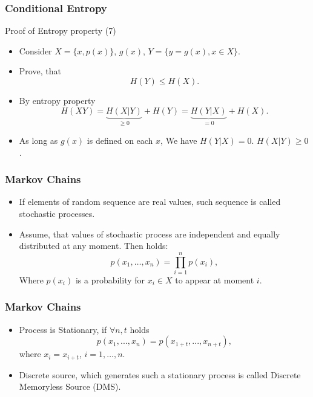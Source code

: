 \documentclass[14pt]{beamer}
\begin{document}
\begin{frame}
\frametitle{Conditional Entropy}
Proof of Entropy property (7)
\begin{itemize}
    
    \item Consider $X = \{x,p(x)\}$, $g(x)$, $Y =\{y = g(x),x\in X\}.$ 
    
    \item Prove, that
    \begin{equation}
    \label{p1eq11} H(Y) \le H(X).
    \end{equation}
    
    \item By entropy property
    \begin{equation}
    \label{p1eq12}
     H(XY) = \underbrace{H(X\vert Y)}_{\ge 0} + H(Y) = \underbrace{H(Y\vert X)}_{=0} + H(X).
    \end{equation}
    
    \item As long as $g(x)$ is defined on each $x$,
    We have $H(Y\vert X) = 0$. $H(X\vert Y) \ge 0$.
    
\end{itemize}
\end{frame}



\begin{frame}
\frametitle{Markov Chains}
\begin{itemize}

    \item If elements of random sequence are real values, such sequence is called stochastic processes.
    
    \item Assume, that values of stochastic process are independent and equally distributed at any moment. Then holds:
    \[
    p(x_1,\dots,x_n ) = \prod\limits_{i = 1}^n {p(x_i )} ,
    \]
    Where $p(x_i )$ is a probability for $x_i \in X$ to appear at moment $i$.
    
\end{itemize}
\end{frame}


\begin{frame}
\frametitle{Markov Chains}
\begin{itemize}
    
    \item Process is Stationary, if $\forall n, t$ holds
    \[
    p(x_1 ,...,x_n ) = p(x_{1 + t} ,...,x_{n + t} ),
    \]
    where $x_i = x_{i + t} $, $i = 1,\dots,n$.
    
    \item Discrete source, which generates such a stationary process is called Discrete Memoryless Source (DMS).
    
\end{itemize}
\end{frame}
\end{document}

